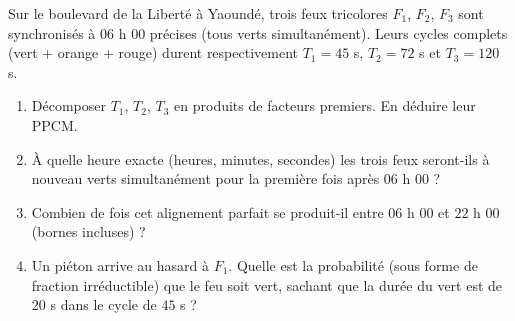 \documentclass[11pt]{article}
\begin{document}
\begin{exercice}
Sur le boulevard de la Liberté à Yaoundé, trois feux tricolores $F_1$, $F_2$, $F_3$ sont synchronisés à $06$ h $00$ précises (tous verts simultanément). Leurs cycles complets (vert + orange + rouge) durent respectivement $T_1 = 45$ s, $T_2 = 72$ s et $T_3 = 120$ s.
\begin{enumerate}
    \item Décomposer $T_1$, $T_2$, $T_3$ en produits de facteurs premiers. En déduire leur PPCM.
    \item À quelle heure exacte (heures, minutes, secondes) les trois feux seront-ils à nouveau verts simultanément pour la première fois après $06$ h $00$ ?
    \item Combien de fois cet alignement parfait se produit-il entre $06$ h $00$ et $22$ h $00$ (bornes incluses) ?
    \item Un piéton arrive au hasard à $F_1$. Quelle est la probabilité (sous forme de fraction irréductible) que le feu soit vert, sachant que la durée du vert est de $20$ s dans le cycle de $45$ s ?
\end{enumerate}
\end{exercice}
\end{document}
